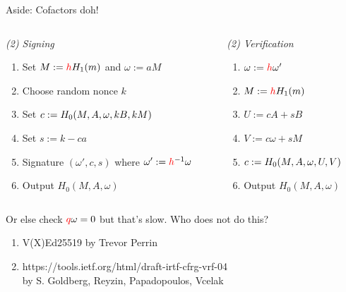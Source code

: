 \documentclass[fleqn,xcolor={usenames,dvipsnames},notes,aspectratio=169]{beamer} %
\begin{document}
\begin{frame}{Aside: Cofactors doh! }

  \begin{columns}
   \begin{column}{0.5\textwidth}
    {\em (2) Signing} \\
    \begin{enumerate}
    \item Set $M := \textcolor{red}{h} H_1(m)$ and $\omega := a M$
    \item Choose random nonce $k$
    \item Set $c := H_0(M,  A, \omega,  k B, k M)$
    \item Set $s := k - c a$
    \item Signature $(\omega',c,s)$ where $\omega' := \textcolor{red}{h}^{-1} \omega$
    \item Output $H_0(M, A, \omega)$
    \end{enumerate}
   \end{column}
   \begin{column}{0.5\textwidth}
    {\em (2) Verification} \\
    \begin{enumerate}
    \item $\omega := \textcolor{red}{h} \omega'$ 
    \item $M := \textcolor{red}{h} H_1(m)$ 
    \item $U := c A + s B$
    \item $V := c \omega + s M$
    \item $c := H_0(M,  A, \omega,  U, V)$
    \item Output $H_0(M, A, \omega)$
    \end{enumerate}
   \end{column}
  \end{columns}
  \bigskip
  Or else check $\textcolor{red}{q} \omega = 0$ but that's slow.
  \smallskip
  Who does not do this?
  \begin{enumerate}
  \item {V(X)Ed25519} by Trevor Perrin
  \item https://tools.ietf.org/html/draft-irtf-cfrg-vrf-04 \\
        by S. Goldberg, Reyzin, Papadopoulos, Vcelak
  \end{enumerate}

\end{frame}
\end{document}
